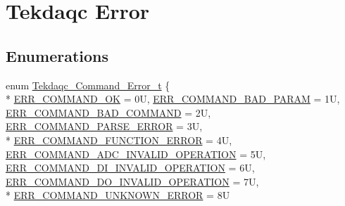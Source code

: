 \hypertarget{group__tekdaqc__error}{\section{Tekdaqc Error}
\label{group__tekdaqc__error}
}
\subsection*{Enumerations}
\begin{DoxyCompactItemize}
\item 
enum \hyperlink{group__tekdaqc__error_ga91c51567356a5f53b2d62610fa1bf397}{Tekdaqc\-\_\-\-Command\-\_\-\-Error\-\_\-t} \{ \\*
\hyperlink{group__tekdaqc__error_gga91c51567356a5f53b2d62610fa1bf397a9bd9fd752b72fd344c88500ca53d48d4}{E\-R\-R\-\_\-\-C\-O\-M\-M\-A\-N\-D\-\_\-\-O\-K} = 0\-U, 
\hyperlink{group__tekdaqc__error_gga91c51567356a5f53b2d62610fa1bf397a6629d1329990ab17b5afb829c7e12f1f}{E\-R\-R\-\_\-\-C\-O\-M\-M\-A\-N\-D\-\_\-\-B\-A\-D\-\_\-\-P\-A\-R\-A\-M} = 1\-U, 
\hyperlink{group__tekdaqc__error_gga91c51567356a5f53b2d62610fa1bf397a6a0e19c2fb9deb5af84cfea28b072265}{E\-R\-R\-\_\-\-C\-O\-M\-M\-A\-N\-D\-\_\-\-B\-A\-D\-\_\-\-C\-O\-M\-M\-A\-N\-D} = 2\-U, 
\hyperlink{group__tekdaqc__error_gga91c51567356a5f53b2d62610fa1bf397a628d3a4d11e7ea7ac8c96fcbc394c297}{E\-R\-R\-\_\-\-C\-O\-M\-M\-A\-N\-D\-\_\-\-P\-A\-R\-S\-E\-\_\-\-E\-R\-R\-O\-R} = 3\-U, 
\\*
\hyperlink{group__tekdaqc__error_gga91c51567356a5f53b2d62610fa1bf397a34a5f40769d968dc3a990c7f331f9121}{E\-R\-R\-\_\-\-C\-O\-M\-M\-A\-N\-D\-\_\-\-F\-U\-N\-C\-T\-I\-O\-N\-\_\-\-E\-R\-R\-O\-R} = 4\-U, 
\hyperlink{group__tekdaqc__error_gga91c51567356a5f53b2d62610fa1bf397a53cb1f7d18c7a7e2f95b7700b4273f9f}{E\-R\-R\-\_\-\-C\-O\-M\-M\-A\-N\-D\-\_\-\-A\-D\-C\-\_\-\-I\-N\-V\-A\-L\-I\-D\-\_\-\-O\-P\-E\-R\-A\-T\-I\-O\-N} = 5\-U, 
\hyperlink{group__tekdaqc__error_gga91c51567356a5f53b2d62610fa1bf397a1944910c8a33fa83ea999c0e83b21add}{E\-R\-R\-\_\-\-C\-O\-M\-M\-A\-N\-D\-\_\-\-D\-I\-\_\-\-I\-N\-V\-A\-L\-I\-D\-\_\-\-O\-P\-E\-R\-A\-T\-I\-O\-N} = 6\-U, 
\hyperlink{group__tekdaqc__error_gga91c51567356a5f53b2d62610fa1bf397a0b3f4f2e4d33d07265fa3731da328514}{E\-R\-R\-\_\-\-C\-O\-M\-M\-A\-N\-D\-\_\-\-D\-O\-\_\-\-I\-N\-V\-A\-L\-I\-D\-\_\-\-O\-P\-E\-R\-A\-T\-I\-O\-N} = 7\-U, 
\\*
\hyperlink{group__tekdaqc__error_gga91c51567356a5f53b2d62610fa1bf397afa2d8d19a4a4f748558910cd9a18aee1}{E\-R\-R\-\_\-\-C\-O\-M\-M\-A\-N\-D\-\_\-\-U\-N\-K\-N\-O\-W\-N\-\_\-\-E\-R\-R\-O\-R} = 8\-U

\end{DoxyCompactItemize}
